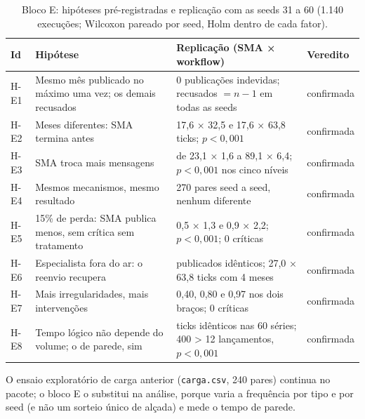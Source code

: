 \documentclass[10pt,a4paper]{article}
\newcommand{\code}[1]{\texttt{#1}}
\newenvironment{tabela}[1]{\begin{table}[H]\centering\footnotesize\renewcommand{\arraystretch}{1.1}\caption{#1}}{\end{table}}
\begin{document}
\begin{tabela}{Bloco E: hipóteses pré-registradas e replicação com as seeds 31 a 60 (1.140 execuções; Wilcoxon pareado por seed, Holm dentro de cada fator).\label{tab:blocoe}}
\begin{tabularx}{\linewidth}{l Y Y l}
\toprule
\textbf{Id} & \textbf{Hipótese} & \textbf{Replicação (SMA × workflow)} & \textbf{Veredito}\\ \midrule
H-E1 & Mesmo mês publicado no máximo uma vez; os demais recusados & 0 publicações indevidas; recusados $= n-1$ em todas as seeds & confirmada\\
H-E2 & Meses diferentes: SMA termina antes & 17,6 × 32,5 e 17,6 × 63,8 ticks; $p<0{,}001$ & confirmada\\
H-E3 & SMA troca mais mensagens & de 23,1 × 1,6 a 89,1 × 6,4; $p<0{,}001$ nos cinco níveis & confirmada\\
H-E4 & Mesmos mecanismos, mesmo resultado & 270 pares seed a seed, nenhum diferente & confirmada\\
H-E5 & 15\% de perda: SMA publica menos, sem crítica sem tratamento & 0,5 × 1,3 e 0,9 × 2,2; $p<0{,}001$; 0 críticas & confirmada\\
H-E6 & Especialista fora do ar: o reenvio recupera & publicados idênticos; 27,0 × 63,8 ticks com 4 meses & confirmada\\
H-E7 & Mais irregularidades, mais intervenções & 0,40, 0,80 e 0,97 nos dois braços; 0 críticas & confirmada\\
H-E8 & Tempo lógico não depende do volume; o de parede, sim & ticks idênticos nas 60 séries; 400 > 12 lançamentos, $p<0{,}001$ & confirmada\\
\bottomrule
\end{tabularx}
\end{tabela}

O ensaio exploratório de carga anterior (\code{carga.csv}, 240 pares) continua no pacote; o bloco E o substitui na
análise, porque varia a frequência por tipo e por seed (e não um sorteio único de alçada) e mede o tempo de parede.

\end{document}
